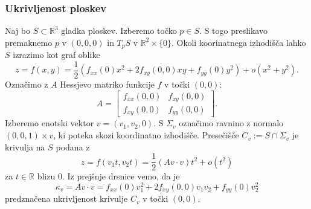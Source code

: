 \documentclass[8pt]{beamer}
\theoremstyle{definition}
\theoremstyle{remark}
\theoremstyle{plain}
\numberwithin{equation}{section}  %
\begin{document}
\begin{frame}
    \frametitle{Ukrivljenost ploskev}

    Naj bo $S \subset \mathbb{R}^3$ gladka ploskev. Izberemo točko $p \in S$. S togo preslikavo premaknemo $p$ v $(0,0,0)$ in $T_p S$ v $\mathbb{R}^2 \times\{0\}$. Okoli koorinatnega izhodišča lahko $S$ izrazimo kot graf oblike 
    \begin{equation*}
        z=f(x, y)=\frac{1}{2}\left(f_{x x}(0) x^2+2 f_{x y}(0,0) x y+f_{y y}(0) y^2\right)+o\left(x^2+y^2\right). 
    \end{equation*}
    \pause 
    Označimo z $A$ Hessjevo matriko funkcije $f$ v točki $(0,0)$:
    \begin{equation*}
        A=\begin{bmatrix}
            f_{x x}(0,0) & f_{x y}(0,0) \\
            f_{x y}(0,0) & f_{y y}(0,0)
        \end{bmatrix} .
    \end{equation*}
    Izberemo enotski vektor $v=\left(v_1, v_2, 0\right)$. S $\Sigma_v$ označimo ravnino z normalo $(0,0,1)\times v$, ki poteka skozi koordinatno izhodišče. Presečišče $C_v:=S \cap \Sigma_v$ je krivulja na $S$ podana z
    \begin{equation*}
        z=f\left(v_1 t, v_2 t\right)=\frac{1}{2}(A v \cdot v) t^2+o\left(t^2\right)
    \end{equation*}
    za $t \in \mathbb{R}$ blizu $0$. \pause Iz prejšnje drsnice vemo, da je 
    \begin{equation*}
        \kappa_v=A v \cdot v=f_{x x}(0) v_1^2+2 f_{x y}(0,0) v_1 v_2+f_{y y}(0) v_2^2
    \end{equation*}
    predznačena ukrivljenost krivulje $C_v$ v točki $(0,0)$.
    
\end{frame}
\end{document}
